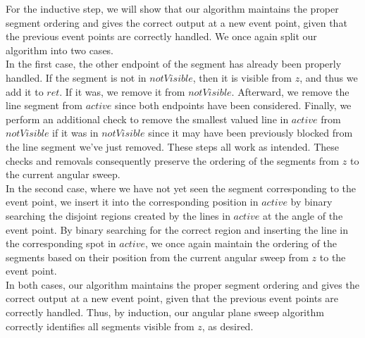 \documentclass[11pt]{article}
\begin{document}
\begin{enumerate}
    For the inductive step, we will show that our algorithm maintains the proper segment ordering and gives the correct output at a new event point, given that the previous event points are correctly handled. We once again split our algorithm into two cases. \\
    
    In the first case, the other endpoint of the segment has already been properly handled. If the segment is not in $notVisible$, then it is visible from $z$, and thus we add it to $ret$. If it was, we remove it from $notVisible$. Afterward, we remove the line segment from $active$ since both endpoints have been considered. Finally, we perform an additional check to remove the smallest valued line in $active$ from $notVisible$ if it was in $notVisible$ since it may have been previously blocked from the line segment we've just removed. These steps all work as intended. These checks and removals consequently preserve the ordering of the segments from $z$ to the current angular sweep.  \\

    In the second case, where we have not yet seen the segment corresponding to the event point, we insert it into the corresponding position in $active$ by binary searching the disjoint regions created by the lines in $active$ at the angle of the event point. By binary searching for the correct region and inserting the line in the corresponding spot in $active$, we once again maintain the ordering of the segments based on their position from the current angular sweep from $z$ to the event point. \\

    In both cases, our algorithm maintains the proper segment ordering and gives the correct output at a new event point, given that the previous event points are correctly handled. Thus, by induction, our angular plane sweep algorithm correctly identifies all segments visible from $z$, as desired.
    

    
    \newpage

\end{enumerate}
\end{document}

